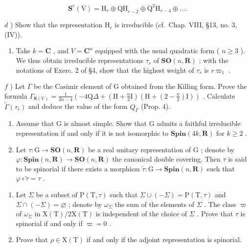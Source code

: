 \begin{enumerate}
\[
\mathbf {S} ^ {r} (\mathrm{V}) = \mathrm{H} _ {r} \oplus \mathrm{QH} _ {r - 2} \oplus \mathrm{Q} ^ {2} \mathrm{H} _ {r - 4} \oplus \dots .
\]

\(d\) ) Show that the representation \(\mathrm{H}_r\) is irreducible (cf.~Chap. VIII, §13, no. 3, (IV)).

\begin{enumerate}
\def\labelenumi{\alph{enumi})}
\setcounter{enumi}{4}
\tightlist
\item
  Take \(k = \mathbf{C}\) , and \(V = \mathbf{C}^n\) equipped with the usual quadratic form ( \(n \geq 3\) ). We thus obtain irreducible representations \(\tau_r\) of \(\mathbf{SO}(n, \mathbf{R})\) ; with the notations of Exerc. 2 of §4, show that the highest weight of \(\tau_r\) is \(r\varpi_1\) .
\end{enumerate}

\(f\) ) Let \(\Gamma\) be the Casimir element of G obtained from the Killing form. Prove the formula \(\Gamma_{\mathbf{S}(\mathrm{V})} = \frac{1}{2n - 4}\left(-4\mathrm{Q}\Delta +\left(\mathrm{H} + \frac{n}{2}\mathrm{I}\right)\left(\mathrm{H} + \left(2 - \frac{n}{2}\right)\mathrm{I}\right)\right)\) . Calculate \(\tilde{\Gamma} (\tau_r)\) and deduce the value of the form \(Q_{\Gamma}\) (Prop. 4).

\begin{enumerate}
\def\labelenumi{\arabic{enumi})}
\setcounter{enumi}{5}
\item
  Assume that G is almost simple. Show that G admits a faithful irreducible representation if and only if it is not isomorphic to \(\mathbf{Spin}(4k, \mathbf{R})\) for \(k \geq 2\) .
\item
  Let \(\tau : \mathrm{G} \to \mathbf{SO}(n, \mathbf{R})\) be a real unitary representation of \(\mathrm{G}\) ; denote by \(\varphi : \mathbf{Spin}(n, \mathbf{R}) \to \mathbf{SO}(n, \mathbf{R})\) the canonical double covering. Then \(\tau\) is said to be spinorial if there exists a morphism \(\tilde{\tau} : \mathrm{G} \to \mathbf{Spin}(n, \mathbf{R})\) such that \(\varphi \circ \tilde{\tau} = \tau\) .
\end{enumerate}

\begin{enumerate}
\def\labelenumi{\alph{enumi})}
\item
  Let \(\Sigma\) be a subset of \(\mathrm{P}(\mathrm{T},\tau)\) such that \(\Sigma\cup(-\Sigma)=\mathrm{P}(\mathrm{T},\tau)\) and \(\Sigma\cap(-\Sigma)=\varnothing\) ; denote by \(\omega_{\Sigma}\) the sum of the elements of \(\Sigma\) . The class \(\varpi\) of \(\omega_{\Sigma}\) in \(\mathrm{X}(\mathrm{T})/2\mathrm{X}(\mathrm{T})\) is independent of the choice of \(\Sigma\) . Prove that \(\tau\) is spinorial if and only if \(\varpi=0\) .
\item
  Prove that \(\rho \in \mathrm{X}(\mathrm{T})\) if and only if the adjoint representation is spinorial.
\end{enumerate}


\end{enumerate}
